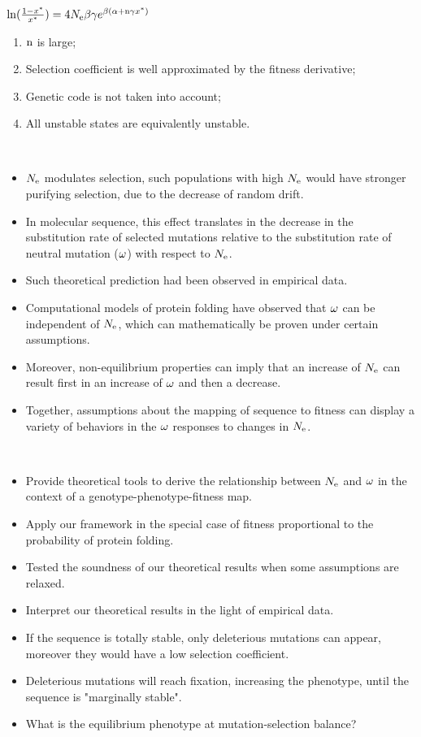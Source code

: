 \documentclass{article}
\begin{document}
$\ln(\frac{1 - x^{*}}{x^{*}})=4N_{\mathrm{e}} \beta \gamma e^{\beta (\alpha + \text{n} \gamma x^{*})}$
~\\
\begin{enumerate}
	\item $\text{n}$ is large;
	\item Selection coefficient is well approximated by the fitness derivative;
	\item Genetic code is not taken into account;
	\item All unstable states are equivalently unstable.
\end{enumerate}
\newpage
~\\
\begin{itemize}
	\item $N_{\mathrm{e}}$ modulates selection, such populations with high $N_{\mathrm{e}}$ would have stronger purifying selection, due to the decrease of random drift.
	\item In molecular sequence, this effect translates in the decrease in the substitution rate of selected mutations relative to the substitution rate of neutral mutation ($\omega$) with respect to $N_{\mathrm{e}}$.
	\item Such theoretical prediction had been observed in empirical data.
	\item Computational models of protein folding have observed that $\omega$ can be independent of $N_{\mathrm{e}}$, which can mathematically be proven under certain assumptions.
	\item Moreover, non-equilibrium properties can imply that an increase of $N_{\mathrm{e}}$ can result first in an increase of $\omega$ and then a decrease.
	\item Together, assumptions about the mapping of sequence to fitness can display a variety of behaviors in the $\omega$ responses to changes in $N_{\mathrm{e}}$.
\end{itemize}

\newpage
~\\
\begin{itemize}
	\item Provide theoretical tools to derive the relationship between $N_{\mathrm{e}}$ and $\omega$ in the context of a genotype-phenotype-fitness map.
	\item Apply our framework in the special case of fitness proportional to the probability of protein folding.
	\item Tested the soundness of our theoretical results when some assumptions are relaxed.
	\item Interpret our theoretical results in the light of empirical data.
	\item If the sequence is totally stable, only deleterious mutations can appear, moreover they would have a low selection coefficient.
	\item Deleterious mutations will reach fixation, increasing the phenotype, until the sequence is "marginally stable".
	\item What is the equilibrium phenotype at mutation-selection balance?
\end{itemize}
\end{document}
